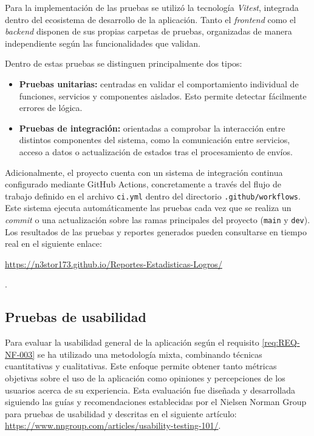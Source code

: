 Para la implementación de las pruebas se utilizó la tecnología \textit{Vitest}, integrada dentro del ecosistema de desarrollo de la aplicación. Tanto el \textit{frontend} como el \textit{backend} disponen de sus propias carpetas de pruebas, organizadas de manera independiente según las funcionalidades que validan.

Dentro de estas pruebas se distinguen principalmente dos tipos:

\begin{itemize}
    \item \textbf{Pruebas unitarias:} centradas en validar el comportamiento individual de funciones, servicios y componentes aislados. Esto permite detectar fácilmente errores de lógica.
    \item \textbf{Pruebas de integración:} orientadas a comprobar la interacción entre distintos componentes del sistema, como la comunicación entre servicios, acceso a datos o actualización de estados tras el procesamiento de envíos.
\end{itemize}

Adicionalmente, el proyecto cuenta con un sistema de integración continua configurado mediante GitHub Actions, concretamente a través del flujo de trabajo definido en el archivo \texttt{ci.yml} dentro del directorio \texttt{.github/workflows}. Este sistema ejecuta automáticamente las pruebas cada vez que se realiza un \textit{commit} o una actualización sobre las ramas principales del proyecto (\texttt{main} y \texttt{dev}).
Los resultados de las pruebas y reportes generados pueden consultarse en tiempo real en el siguiente enlace:
\begin{center}
\url{https://n3stor173.github.io/Reportes-Estadisticas-Logros/}
\end{center}.

\subsection{Pruebas de usabilidad}

Para evaluar la usabilidad general de la aplicación según el requisito \autoref{req:REQ-NF-003} se ha utilizado una metodología mixta, combinando técnicas cuantitativas y cualitativas. Este enfoque permite obtener tanto métricas objetivas sobre el uso de la aplicación como opiniones y percepciones de los usuarios acerca de su experiencia.
Esta evaluación fue diseñada y desarrollada siguiendo las guías y recomendaciones establecidas por el Nielsen Norman Group para pruebas de usabilidad y descritas en el siguiente artículo: \url{https://www.nngroup.com/articles/usability-testing-101/}. 

